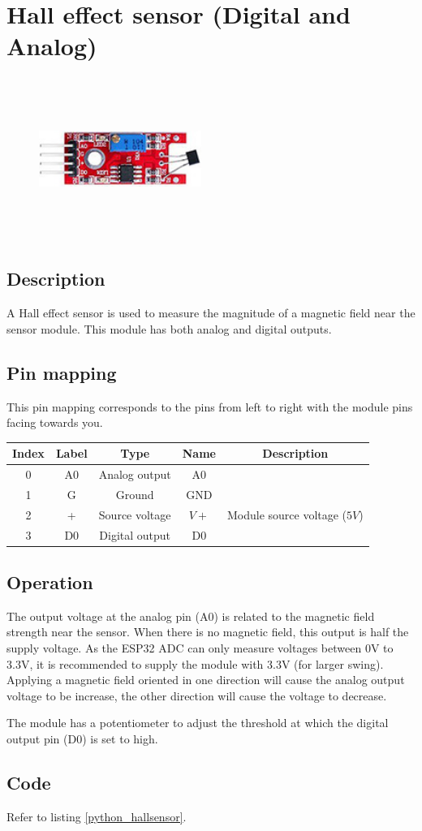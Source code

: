 \section{Hall effect sensor (Digital and Analog)}
\begin{figure}[H]
    \centering
    \includegraphics[angle=0, keepaspectratio=true, scale=1, width=200px, height=200px]{images/halleffect_analog_digital.jpg}
\end{figure}
\subsection*{Description}
A Hall effect sensor is used to measure the magnitude of a magnetic field near the sensor module. This module has both analog and digital outputs.
\subsection*{Pin mapping}
This pin mapping corresponds to the pins from left to right with the module pins facing towards you.
\begin{table}[H]
    \centering
    \begin{tabular}{|c|c|c|c|c|}
    \hline
    Index &Label &Type &Name &Description\\ \hline
    0 &A0 &Analog output &A0 &\\ \hline
    1 &G &Ground &GND &\\ \hline
    2 &+ &Source voltage &$V+$ &Module source voltage ($5V$)\\ \hline
    3 &D0 &Digital output &D0 &\\ \hline
    \end{tabular}
\end{table}
\subsection*{Operation}
The output voltage at the analog pin (A0) is related to the magnetic field strength near the sensor. When there is no magnetic field, this output is half the supply voltage. As the ESP32 ADC can only measure voltages between 0V to 3.3V, it is recommended to supply the module with 3.3V (for larger swing). Applying a magnetic field oriented in one direction will cause the analog output voltage to be increase, the other direction will cause the voltage to decrease.

The module has a potentiometer to adjust the threshold at which the digital output pin (D0) is set to high.
\subsection*{Code}
Refer to listing \ref{python_hallsensor}.
%